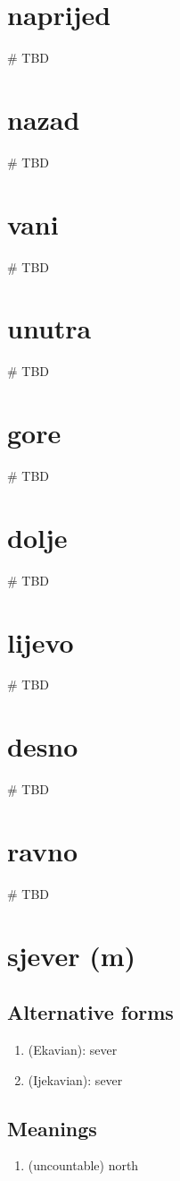 \filbreak
\filbreak
\section{naprijed}
{\# TBD}
\filbreak
\section{nazad}
{\# TBD}
\filbreak
\section{vani}
{\# TBD}
\filbreak
\section{unutra}
{\# TBD}
\section{gore}
{\# TBD}
\filbreak
\section{dolje}
{\# TBD}
\filbreak
\section{lijevo}
{\# TBD}
\filbreak
\section{desno}
{\# TBD}
\filbreak
\section{ravno}
{\# TBD}
\section{sjever (m)}
\subsection*{Alternative forms}
\begin{enumerate}
\item (Ekavian): sever
\item (Ijekavian): sever
\end{enumerate}
\subsection*{Meanings}
\begin{enumerate}
\item (uncountable) north
\end{enumerate}
